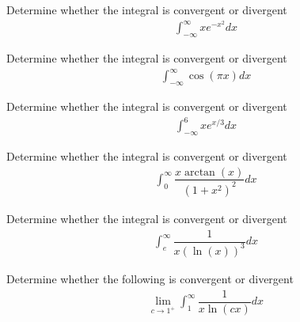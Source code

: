 \begin{exercise}
Determine whether the integral is convergent or divergent
\begin{align*}
    \int_{-\infty}^{\infty} xe^{-x^{2}} dx
\end{align*}
\end{exercise}

\begin{exercise}
Determine whether the integral is convergent or divergent
\begin{align*}
    \int_{-\infty}^{\infty} \cos(\pi x) dx
\end{align*}
\end{exercise}

\begin{exercise}
Determine whether the integral is convergent or divergent
\begin{align*}
    \int_{-\infty}^{6} xe^{x/3} dx
\end{align*}
\end{exercise}

\begin{exercise}
Determine whether the integral is convergent or divergent
\begin{align*}
    \int_{0}^{\infty} \dfrac{x \arctan(x)}{(1+x^{2})^{2}}dx
\end{align*}
\end{exercise}

\begin{exercise}
Determine whether the integral is convergent or divergent
\begin{align*}
    \int_{e}^{\infty} \dfrac{1}{x (\ln(x))^{3}}dx
\end{align*}
\end{exercise}

\begin{exercise}
Determine whether the following is convergent or divergent
\begin{align*}
    \lim_{c \longrightarrow 1^{+}} \int_{1}^{\infty} \dfrac{1}{x \ln(cx)} dx
\end{align*}
\end{exercise}